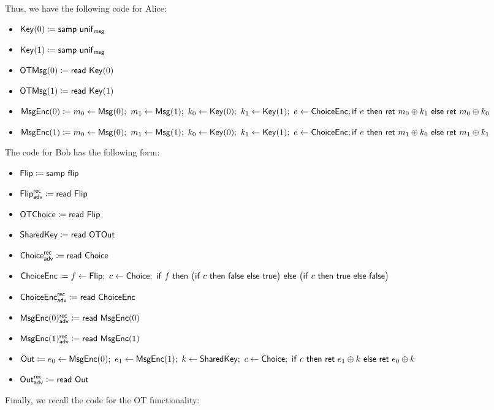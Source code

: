 Thus, we have the following code for Alice:
\begin{itemize}
\item $\mathsf{Key}(0) \coloneqq \mathsf{samp} \ \mathsf{unif}_{\mathsf{msg}}$
\item $\mathsf{Key}(1) \coloneqq \mathsf{samp} \ \mathsf{unif}_{\mathsf{msg}}$
\item $\mathsf{OTMsg}(0) \coloneqq \mathsf{read} \ \mathsf{Key}(0)$
\item $\mathsf{OTMsg}(1) \coloneqq \mathsf{read} \ \mathsf{Key}(1)$
\item $\mathsf{MsgEnc}(0) \coloneqq m_0 \leftarrow \mathsf{Msg}(0); \ m_1 \leftarrow \mathsf{Msg}(1); \ k_0 \leftarrow \mathsf{Key}(0); \ k_1 \leftarrow \mathsf{Key}(1); \ e \leftarrow \mathsf{ChoiceEnc}; \\ \mathsf{if} \ e \ \mathsf{then} \ \mathsf{ret} \ m_0 \oplus k_1 \ \mathsf{else} \ \mathsf{ret} \ m_0 \oplus k_0$
\item $\mathsf{MsgEnc}(1) \coloneqq m_0 \leftarrow \mathsf{Msg}(0); \ m_1 \leftarrow \mathsf{Msg}(1); \ k_0 \leftarrow \mathsf{Key}(0); \ k_1 \leftarrow \mathsf{Key}(1); \ e \leftarrow \mathsf{ChoiceEnc}; \\ \mathsf{if} \ e \ \mathsf{then} \ \mathsf{ret} \ m_1 \oplus k_0 \ \mathsf{else} \ \mathsf{ret} \ m_1 \oplus k_1$
\end{itemize}
The code for Bob has the following form:
\begin{itemize}
\item $\mathsf{Flip} \coloneqq \mathsf{samp} \ \mathsf{flip}$
\item {\color{blue} $\mathsf{Flip}^{\mathsf{rec}}_{\mathsf{adv}} \coloneqq \mathsf{read} \ \mathsf{Flip}$}
\item $\mathsf{OTChoice} \coloneqq \mathsf{read} \ \mathsf{Flip}$
\item $\mathsf{SharedKey} \coloneqq \mathsf{read} \ \mathsf{OTOut}$
\item {\color{blue} $\mathsf{Choice}^{\mathsf{rec}}_{\mathsf{adv}} \coloneqq \mathsf{read} \ \mathsf{Choice}$}
\item $\ChoiceEnc \coloneqq f \leftarrow \Flip; \ c \leftarrow \Choice; \ \ifte{f}{\big(\ifte{c}{\false}{\true}\big)}{\big(\ifte{c}{\true}{\false}\big)}$
\item {\color{blue} $\mathsf{ChoiceEnc}^{\mathsf{rec}}_{\mathsf{adv}} \coloneqq \mathsf{read} \ \mathsf{ChoiceEnc}$}
\item {\color{blue} $\mathsf{MsgEnc}(0)^{\mathsf{rec}}_{\mathsf{adv}} \coloneqq \mathsf{read} \ \mathsf{MsgEnc}(0)$}
\item {\color{blue} $\mathsf{MsgEnc}(1)^{\mathsf{rec}}_{\mathsf{adv}} \coloneqq \mathsf{read} \ \mathsf{MsgEnc}(1)$}
\item $\mathsf{Out} \coloneqq e_0 \leftarrow \mathsf{MsgEnc}(0); \ e_1 \leftarrow \mathsf{MsgEnc}(1); \ k \leftarrow \mathsf{SharedKey}; \ c \leftarrow \mathsf{Choice}; \ \mathsf{if} \ c \ \mathsf{then} \ \mathsf{ret} \ e_1 \oplus k \ \mathsf{else} \ \mathsf{ret} \ e_0 \oplus k$
\item {\color{blue} $\mathsf{Out}^{\mathsf{rec}}_{\mathsf{adv}} \coloneqq \mathsf{read} \ \mathsf{Out}$}
\end{itemize}
Finally, we recall the code for the OT functionality:
